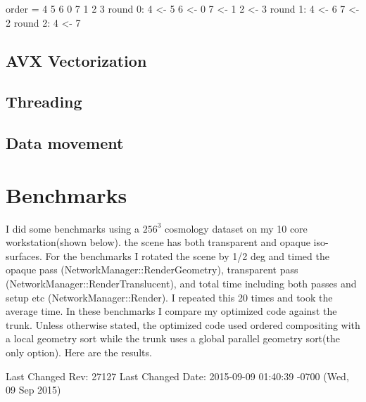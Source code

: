 \documentclass[a4paper,10pt]{report}
\begin{document}
order = 4 5 6 0 7 1 2 3 
round 0:
4 <- 5 6 <- 0 7 <- 1 2 <- 3 
round 1:
4 <- 6 7 <- 2 
round 2:
4 <- 7 



\subsection{AVX Vectorization}
\subsection{Threading}
\subsection{Data movement}

\section{Benchmarks}
I did some benchmarks using a $256^3$ cosmology dataset on my 10 core workstation(shown below).  the scene has both transparent and opaque iso-surfaces. For the benchmarks I rotated the scene by 1/2 deg and timed the opaque pass (NetworkManager::RenderGeometry), transparent pass (NetworkManager::RenderTranslucent), and total time including both passes and setup etc (NetworkManager::Render). I repeated this 20 times and took the average time. In these benchmarks I compare my optimized code against the trunk. Unless otherwise stated, the optimized code used ordered compositing with a local geometry sort while the trunk uses a global parallel geometry sort(the only option). Here are the results.

Last Changed Rev: 27127
Last Changed Date: 2015-09-09 01:40:39 -0700 (Wed, 09 Sep 2015)
\end{document}
